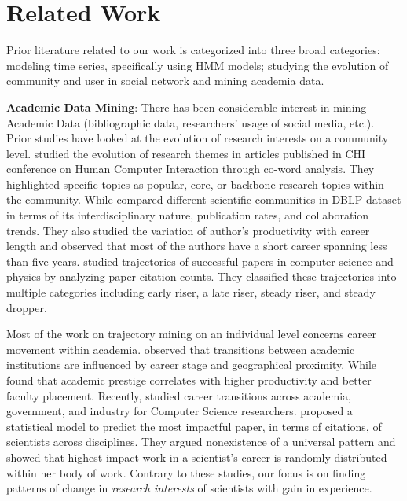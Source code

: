\documentclass[10pt,letterpaper]{article}
\begin{document}
\section*{Related Work}
Prior literature related to our work is categorized into three broad categories: modeling time series, specifically using HMM models; studying the evolution of community and user in social network and mining academia data.

\textbf{Academic Data Mining}: There has been considerable interest in mining Academic Data (bibliographic data, researchers' usage of social media, etc.). Prior studies have looked at the evolution of research interests on a community level. \cite{liu2014chi} studied the evolution of research themes in articles published in CHI conference on Human
Computer Interaction through co-word analysis. They highlighted specific topics as popular, core, or backbone research topics within the community. While \cite{Biryukov:2010} compared different scientific communities in DBLP dataset in terms of its interdisciplinary nature, publication rates, and collaboration trends. They also studied the variation of author's productivity with career length and observed that most of the authors have a short career spanning less than five years. \cite{Chakraborty:2018} studied trajectories of successful papers in computer science and physics by analyzing paper citation counts. They classified these trajectories into multiple categories including early riser, a late riser, steady riser, and steady dropper.

Most of the work on trajectory mining on an individual level concerns career movement within academia. \cite{deville:2014} observed that transitions between academic institutions are influenced by career stage and geographical proximity. While \cite{clauset:2015} found that academic prestige correlates with higher productivity and better faculty placement. Recently, \cite{Danai:2018} studied career transitions across academia, government, and industry for Computer Science researchers. \cite{dashun:2013} proposed a statistical model to predict the most impactful paper, in terms of citations, of scientists across disciplines. They argued nonexistence of a universal pattern and showed that highest-impact work in a scientist's career is randomly distributed within her body of work. Contrary to these studies, our focus is on finding patterns of change in \emph{research interests} of scientists with gain in experience. %
\end{document}
